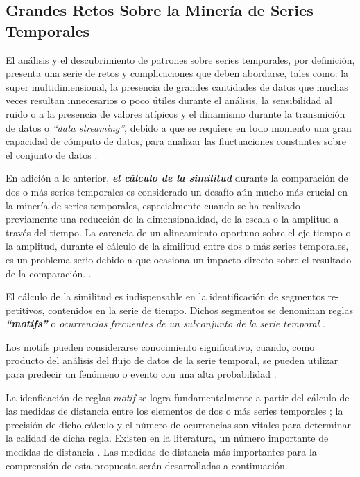 \subsection{Grandes Retos Sobre la Miner\'ia de Series Temporales}
El an\'alisis y el descubrimiento de patrones sobre series temporales, por definici\'on, presenta una serie de retos y complicaciones que deben abordarse, tales como: la super multidimensional, la presencia de grandes cantidades de datos que muchas veces resultan innecesarios o poco \'utiles durante el an\'alisis, la sensibilidad al ruido o a la presencia de valores at\'ipicos y el dinamismo durante la transmici\'on de datos o \textit{\enquote{data streaming}}, debido a que se requiere en todo momento una gran capacidad de c\'omputo de datos, para analizar las fluctuaciones constantes sobre el conjunto de datos \cite{main}.\par
En adici\'on a lo anterior, \textit{\textbf{el c\'alculo de la similitud}} durante la comparaci\'on de dos o m\'as series temporales es considerado un desaf\'io a\'un mucho m\'as crucial en la miner\'ia de series temporales, especialmente cuando se ha realizado previamente una reducci\'on de la dimensionalidad, de la escala o la amplitud a trav\'es del tiempo. La carencia de un alineamiento oportuno sobre el eje tiempo o la amplitud, durante el c\'alculo de la similitud entre dos o m\'as series temporales, es un problema serio debido a que ocasiona un impacto directo sobre el resultado de la comparaci\'on. \cite{concepts}.\par
El c\'alculo de la similitud es indispensable en la identificaci\'on de segmentos re-petitivos, contenidos en la serie de tiempo. Dichos segmentos se denominan reglas \textit{\textbf{\enquote{motifs}}} o \textit{ocurrencias frecuentes de un subconjunto de la serie temporal} \cite{main}.\par
Los motifs pueden considerarse conocimiento significativo, cuando, como producto del an\'alisis del flujo de datos de la serie temporal, se pueden utilizar para predecir un fen\'omeno o evento con una alta probabilidad \cite{main}.\par
La idenficaci\'on de reglas \textit{motif} se logra fundamentalmente a partir del c\'alculo de las medidas de distancia entre los elementos de dos o m\'as series temporales \cite{main}; la precisi\'on de dicho c\'alculo y el n\'umero de ocurrencias son vitales para determinar la calidad de dicha regla. Existen en la literatura, un n\'umero importante de medidas de distancia \cite{distancecomparison}. Las medidas de distancia m\'as importantes para la comprensi\'on de esta propuesta ser\'an desarrolladas a continuaci\'on.
